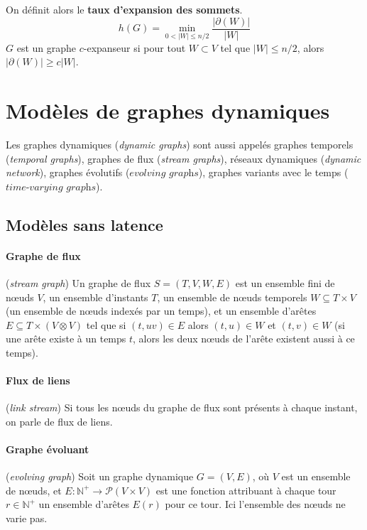\documentclass[12pt,a4paper]{article}
\begin{document}
\begin{description}
  On définit alors le \textbf{taux d'expansion des sommets}.
  \[h(G) = \min_{0 < |W| \leq n/2}\frac{|\partial(W)|}{|W|}\]
  \(G\) est un graphe \(c\)-expanseur si pour tout \(W \subset V\) tel
  que \(|W| \leq n / 2\), alors \(|\partial(W)| \geq c |W|\).
\end{description}

\section{Modèles de graphes dynamiques}

Les graphes dynamiques (\textit{dynamic graphs}) sont aussi appelés
graphes temporels (\textit{temporal graphs}), graphes de flux
(\textit{stream graphs}), réseaux dynamiques (\textit{dynamic
  network}), graphes évolutifs (\(\textit{evolving graphs}\)),
graphes variants avec le temps (\(\textit{time-varying graphs}\)).

\subsection{Modèles sans latence}

\paragraph{Graphe de flux}\cite{latapy2017stream} (\textit{stream
  graph}) Un graphe de flux \(S = (T, V, W, E)\) est un ensemble fini
de nœuds \(V\), un ensemble d'instants \(T\), un ensemble de nœuds
temporels \(W \subseteq T \times V\) (un ensemble de nœuds indexés par
un temps), et un ensemble d'arêtes
\(E \subseteq T \times (V \otimes V)\) tel que si \((t, uv) \in E\)
alors \((t, u) \in W\) et \((t, v) \in W\) (si une arête existe à un
temps \(t\), alors les deux nœuds de l'arête existent aussi à ce
temps).

\paragraph{Flux de liens}\cite{latapy2017stream} (\textit{link
stream}) Si tous les nœuds du graphe de flux sont présents à chaque
instant, on parle de flux de liens.

\paragraph{Graphe évoluant}\cite{kuhn2011dynamic} (\textit{evolving
  graph}) Soit un graphe dynamique \(G = (V, E)\), où \(V\) est un
ensemble de nœuds, et
\(E : \mathbb{N}^{+} \to \mathcal{P}(V \times V)\) est une fonction
attribuant à chaque tour \(r \in \mathbb{N}^{+}\) un ensemble d'arêtes
\(E(r)\) pour ce tour. Ici l'ensemble des nœuds ne varie pas.\\
\end{document}
